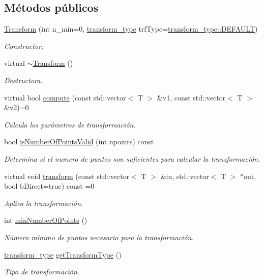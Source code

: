\subsection*{Métodos públicos}
\begin{DoxyCompactItemize}
\item 
\hyperlink{class_i3_d_1_1_transform_a65f115efcbc52cec0dad27664e2e48c3}{Transform} (int n\+\_\+min=0, \hyperlink{group__trf_group_ga175e1580b1ecbc0710ad48060d56c2a3}{transform\+\_\+type} trf\+Type=\hyperlink{group__trf_group_gga175e1580b1ecbc0710ad48060d56c2a3a5b39c8b553c821e7cddc6da64b5bd2ee}{transform\+\_\+type\+::\+D\+E\+F\+A\+U\+LT})
\begin{DoxyCompactList}\small\item\em Constructor. \end{DoxyCompactList}\item 
virtual \hyperlink{class_i3_d_1_1_transform_a7b3aa01e8b48ee45604ebb9cc1e0ed56}{$\sim$\+Transform} ()
\begin{DoxyCompactList}\small\item\em Destructora. \end{DoxyCompactList}\item 
virtual bool \hyperlink{class_i3_d_1_1_transform_a909a4033f9fab3f091b433b9e2261208}{compute} (const std\+::vector$<$ T $>$ \&v1, const std\+::vector$<$ T $>$ \&v2)=0
\begin{DoxyCompactList}\small\item\em Calcula los parámetros de transformación. \end{DoxyCompactList}\item 
bool \hyperlink{class_i3_d_1_1_transform_ab02fc57452ec9edeb339242b682dc829}{is\+Number\+Of\+Points\+Valid} (int npoints) const 
\begin{DoxyCompactList}\small\item\em Determina si el numero de puntos son suficientes para calcular la transformación. \end{DoxyCompactList}\item 
virtual void \hyperlink{class_i3_d_1_1_transform_adbec7381bfc66b4a766a00fdf16de0fe}{transform} (const std\+::vector$<$ T $>$ \&in, std\+::vector$<$ T $>$ $\ast$out, bool b\+Direct=true) const  =0
\begin{DoxyCompactList}\small\item\em Aplica la transformación. \end{DoxyCompactList}\item 
int \hyperlink{class_i3_d_1_1_transform_ad0a61ba37895c3b70e47b9e66a69bbbd}{min\+Number\+Of\+Points} ()
\begin{DoxyCompactList}\small\item\em Número mínimo de puntos necesario para la transformación. \end{DoxyCompactList}\item 
\hyperlink{group__trf_group_ga175e1580b1ecbc0710ad48060d56c2a3}{transform\+\_\+type} \hyperlink{class_i3_d_1_1_transform_aaed30aa2e0b864a338c0bac5ccf3d963}{get\+Transform\+Type} ()
\begin{DoxyCompactList}\small\item\em Tipo de transformación. \end{DoxyCompactList}\end{DoxyCompactItemize}
